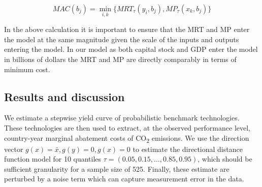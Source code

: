 \documentclass[
  10pt,
]{article}
\begin{document}
\begin{equation}
MAC(b_{j})=\displaystyle \min_{i,k}\{MRT_{\tau}(y_{i},b_{j}), MP_{\tau}(x_{k},b_{j})\} 
\end{equation}

In the above calculation it is important to ensure that the MRT and MP
enter the model at the same magnitude given the scale of the inputs and
outputs entering the model. In our model as both capital stock and GDP
enter the model in billions of dollars the MRT and MP are directly
comparably in terms of minimum cost.

\hypertarget{results-and-discussion}{%
\subsection{Results and discussion}\label{results-and-discussion}}

We estimate a stepwise yield curve of probabilistic benchmark
technologies. These technologies are then used to extract, at the
observed performance level, country-year marginal abatement costs of
CO\textsubscript{2} emissions. We use the direction vector
\(g(x)=\bar{x}, g(y)=0, g(x)=0\) to estimate the directional distance
function model for 10 quantiles \(\tau=(0.05,0.15,\dots,0.85,0.95)\),
which should be sufficient granularity for a sample size of 525.
Finally, these estimate are perturbed by a noise term which can capture
measurement error in the data.
\end{document}
